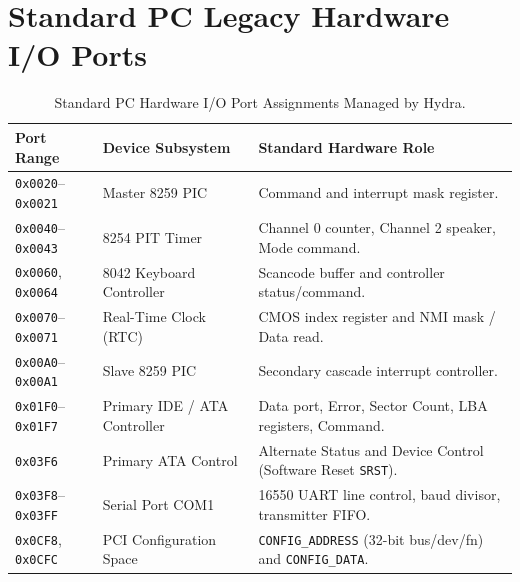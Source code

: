 \section{Standard PC Legacy Hardware I/O Ports}
\label{sec:pc_io_ports}

\begin{table}[htbp]
\centering
\small
\begin{tabular}{lll}
\toprule
\textbf{Port Range} & \textbf{Device Subsystem} & \textbf{Standard Hardware Role} \\
\midrule
\texttt{0x0020}--\texttt{0x0021} & Master 8259 PIC & Command and interrupt mask register. \\
\texttt{0x0040}--\texttt{0x0043} & 8254 PIT Timer & Channel 0 counter, Channel 2 speaker, Mode command. \\
\texttt{0x0060}, \texttt{0x0064} & 8042 Keyboard Controller & Scancode buffer and controller status/command. \\
\texttt{0x0070}--\texttt{0x0071} & Real-Time Clock (RTC) & CMOS index register and NMI mask / Data read. \\
\texttt{0x00A0}--\texttt{0x00A1} & Slave 8259 PIC & Secondary cascade interrupt controller. \\
\texttt{0x01F0}--\texttt{0x01F7} & Primary IDE / ATA Controller & Data port, Error, Sector Count, LBA registers, Command. \\
\texttt{0x03F6} & Primary ATA Control & Alternate Status and Device Control (Software Reset \texttt{SRST}). \\
\texttt{0x03F8}--\texttt{0x03FF} & Serial Port COM1 & 16550 UART line control, baud divisor, transmitter FIFO. \\
\texttt{0x0CF8}, \texttt{0x0CFC} & PCI Configuration Space & \texttt{CONFIG\_ADDRESS} (32-bit bus/dev/fn) and \texttt{CONFIG\_DATA}. \\
\bottomrule
\end{tabular}
\caption{Standard PC Hardware I/O Port Assignments Managed by Hydra.}
\label{tab:io_ports}
\end{table}
